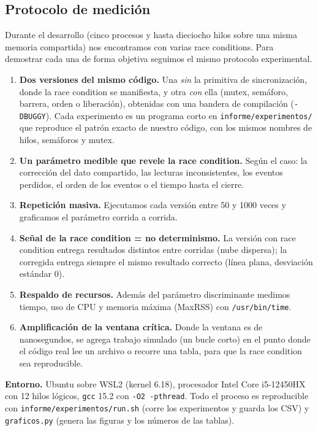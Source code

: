 \documentclass[11pt,a4paper]{article}
\newcommand{\cod}[1]{\texttt{#1}}
\renewcommand{\_}{\textunderscore\allowbreak}
\begin{document}
\subsection{Protocolo de medición}

Durante el desarrollo (cinco procesos y hasta dieciocho hilos sobre una misma memoria compartida) nos encontramos con varias race conditions. Para demostrar cada una de forma objetiva seguimos el mismo protocolo experimental.

\begin{enumerate}
  \item \textbf{Dos versiones del mismo código.} Una \emph{sin} la primitiva de sincronización, donde la race condition se manifiesta, y otra \emph{con} ella (mutex, semáforo, barrera, orden o liberación), obtenidas con una bandera de compilación (\cod{-DBUGGY}). Cada experimento es un programa corto en \cod{informe/experimentos/} que reproduce el patrón exacto de nuestro código, con los mismos nombres de hilos, semáforos y mutex.
  \item \textbf{Un parámetro medible que revele la race condition.} Según el caso: la corrección del dato compartido, las lecturas inconsistentes, los eventos perdidos, el orden de los eventos o el tiempo hasta el cierre.
  \item \textbf{Repetición masiva.} Ejecutamos cada versión entre 50 y 1000 veces y graficamos el parámetro corrida a corrida.
  \item \textbf{Señal de la race condition = no determinismo.} La versión con race condition entrega resultados distintos entre corridas (nube dispersa); la corregida entrega siempre el mismo resultado correcto (línea plana, desviación estándar 0).
  \item \textbf{Respaldo de recursos.} Además del parámetro discriminante medimos tiempo, uso de CPU y memoria máxima (MaxRSS) con \cod{/usr/bin/time}.
  \item \textbf{Amplificación de la ventana crítica.} Donde la ventana es de nanosegundos, se agrega trabajo simulado (un bucle corto) en el punto donde el código real lee un archivo o recorre una tabla, para que la race condition sea reproducible.
\end{enumerate}

\textbf{Entorno.} Ubuntu sobre WSL2 (kernel 6.18), procesador Intel Core i5-12450HX con 12 hilos lógicos, \cod{gcc} 15.2 con \cod{-O2 -pthread}. Todo el proceso es reproducible con \cod{informe/experimentos/run.sh} (corre los experimentos y guarda los CSV) y \cod{graficos.py} (genera las figuras y los números de las tablas).
\end{document}
